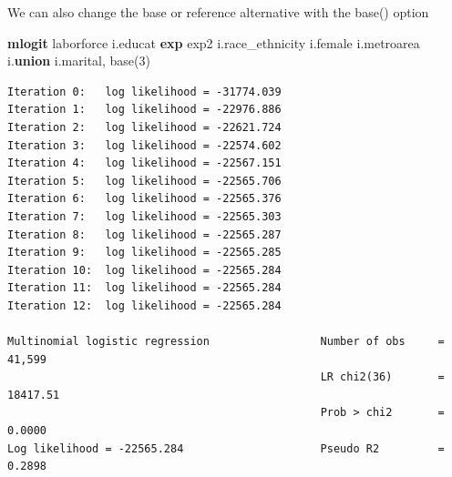 \documentclass[
]{book}
\newenvironment{Shaded}{\begin{snugshade}}{\end{snugshade}}
\newcommand{\FunctionTok}[1]{\textcolor[rgb]{0.13,0.29,0.53}{\textbf{#1}}}
\newcommand{\KeywordTok}[1]{\textcolor[rgb]{0.13,0.29,0.53}{\textbf{#1}}}
\newcommand{\NormalTok}[1]{#1}
\begin{document}
We can also change the base or reference alternative with the base() option

\begin{Shaded}
\begin{Highlighting}[]
\KeywordTok{mlogit}\NormalTok{ laborforce i.educat }\FunctionTok{exp}\NormalTok{ exp2 i.race\_ethnicity i.female i.metroarea i.}\KeywordTok{union}\NormalTok{ i.marital, base(3)}
\end{Highlighting}
\end{Shaded}

\begin{verbatim}
Iteration 0:   log likelihood = -31774.039  
Iteration 1:   log likelihood = -22976.886  
Iteration 2:   log likelihood = -22621.724  
Iteration 3:   log likelihood = -22574.602  
Iteration 4:   log likelihood = -22567.151  
Iteration 5:   log likelihood = -22565.706  
Iteration 6:   log likelihood = -22565.376  
Iteration 7:   log likelihood = -22565.303  
Iteration 8:   log likelihood = -22565.287  
Iteration 9:   log likelihood = -22565.285  
Iteration 10:  log likelihood = -22565.284  
Iteration 11:  log likelihood = -22565.284  
Iteration 12:  log likelihood = -22565.284  

Multinomial logistic regression                 Number of obs     =     41,599
                                                LR chi2(36)       =   18417.51
                                                Prob > chi2       =     0.0000
Log likelihood = -22565.284                     Pseudo R2         =     0.2898


\end{verbatim}
\end{document}
